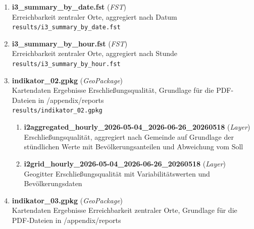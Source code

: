 \begin{enumerate}[label=A\arabic*, ref=A\arabic*, leftmargin=*, itemsep=0.5em, topsep=0.3em]
\begin{enumerate}[label=A\arabic{enumi}-\arabic*, ref=A\arabic{enumi}-\arabic*, leftmargin=*, itemsep=0.5em, topsep=0.3em]
\edef\appendixlabelkey{app:A\arabic{enumi}-\arabic{enumii}}
\expandafter\label\expandafter{\appendixlabelkey}
\item \textbf{i3\_summary\_by\_date.fst} \textnormal{(\textit{FST})}\\
Erreichbarkeit zentraler Orte, aggregiert nach Datum\\
\texttt{\small results/i3\_summary\_by\_date.fst}
\edef\appendixlabelkey{app:A\arabic{enumi}-\arabic{enumii}}
\expandafter\label\expandafter{\appendixlabelkey}
\item \textbf{i3\_summary\_by\_hour.fst} \textnormal{(\textit{FST})}\\
Erreichbarkeit zentraler Orte, aggregiert nach Stunde\\
\texttt{\small results/i3\_summary\_by\_hour.fst}
\edef\appendixlabelkey{app:A\arabic{enumi}-\arabic{enumii}}
\expandafter\label\expandafter{\appendixlabelkey}
\item \textbf{indikator\_02.gpkg} \textnormal{(\textit{GeoPackage})}\\
Kartendaten Ergebnisse Erschließungsqualität, Grundlage für die PDF-Dateien in /appendix/reports\\
\texttt{\small results/indikator\_02.gpkg}
\edef\appendixlabelkey{app:A\arabic{enumi}-\arabic{enumii}}
\expandafter\label\expandafter{\appendixlabelkey}
\begin{enumerate}[label=A\arabic{enumi}-\arabic{enumii}-\arabic*, ref=A\arabic{enumi}-\arabic{enumii}-\arabic*, leftmargin=*, itemsep=0.5em, topsep=0.3em]
\item \textbf{i2aggregated\_hourly\_2026-05-04\_2026-06-26\_20260518} \textnormal{(\textit{Layer})}\\
Erschließungsqualität, aggregiert nach Gemeinde auf Grundlage der stündlichen Werte mit Bevölkerungsanteilen und Abweichung vom Soll
\edef\appendixlabelkey{app:A\arabic{enumi}-\arabic{enumii}-\arabic{enumiii}}
\expandafter\label\expandafter{\appendixlabelkey}
\item \textbf{i2grid\_hourly\_2026-05-04\_2026-06-26\_20260518} \textnormal{(\textit{Layer})}\\
Geogitter Erschließungsqualität mit Variabilitätswerten und Bevölkerungsdaten
\edef\appendixlabelkey{app:A\arabic{enumi}-\arabic{enumii}-\arabic{enumiii}}
\expandafter\label\expandafter{\appendixlabelkey}
\end{enumerate}
\item \textbf{indikator\_03.gpkg} \textnormal{(\textit{GeoPackage})}\\
Kartendaten Ergebnisse Erreichbarkeit zentraler Orte, Grundlage für die PDF-Dateien in /appendix/reports\\

\end{enumerate}
\end{enumerate}
